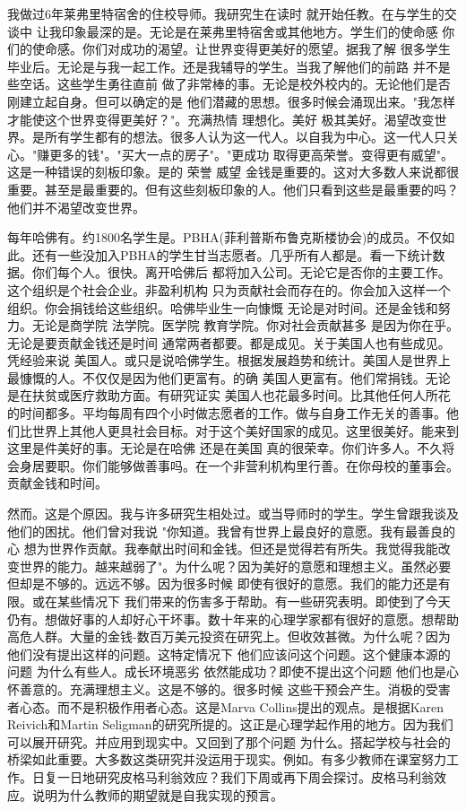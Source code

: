 我做过6年莱弗里特宿舍的住校导师。我研究生在读时 就开始任教。在与学生的交谈中 让我印象最深的是。无论是在莱弗里特宿舍或其他地方。学生们的使命感 你们的使命感。你们对成功的渴望。让世界变得更美好的愿望。据我了解 很多学生毕业后。无论是与我一起工作。还是我辅导的学生。当我了解他们的前路 并不是些空话。这些学生勇往直前 做了非常棒的事。无论是校外校内的。无论他们是否刚建立起自身。但可以确定的是 他们潜藏的思想。很多时候会涌现出来。"我怎样才能使这个世界变得更美好？"。充满热情 理想化。美好 极其美好。渴望改变世界。是所有学生都有的想法。很多人认为这一代人。以自我为中心。这一代人只关心。"赚更多的钱"。"买大一点的房子"。"更成功 取得更高荣誉。变得更有威望"。这是一种错误的刻板印象。是的 荣誉 威望 金钱是重要的。这对大多数人来说都很重要。甚至是最重要的。但有这些刻板印象的人。他们只看到这些是最重要的吗？他们并不渴望改变世界。 

每年哈佛有。约1800名学生是。PBHA(菲利普斯布鲁克斯楼协会)的成员。不仅如此。还有一些没加入PBHA的学生甘当志愿者。几乎所有人都是。看一下统计数据。你们每个人。很快。离开哈佛后 都将加入公司。无论它是否你的主要工作。这个组织是个社会企业。非盈利机构 只为贡献社会而存在的。你会加入这样一个组织。你会捐钱给这些组织。哈佛毕业生一向慷慨 无论是对时间。还是金钱和努力。无论是商学院 法学院。医学院 教育学院。你对社会贡献甚多 是因为你在乎。无论是要贡献金钱还是时间 通常两者都要。都是成见。关于美国人也有些成见。凭经验来说 美国人。或只是说哈佛学生。根据发展趋势和统计。美国人是世界上最慷慨的人。不仅仅是因为他们更富有。的确 美国人更富有。他们常捐钱。无论是在扶贫或医疗救助方面。有研究证实 美国人也花最多时间。比其他任何人所花的时间都多。平均每周有四个小时做志愿者的工作。做与自身工作无关的善事。他们比世界上其他人更具社会目标。对于这个美好国家的成见。这里很美好。能来到这里是件美好的事。无论是在哈佛 还是在美国 真的很荣幸。你们许多人。不久将会身居要职。你们能够做善事吗。在一个非营利机构里行善。在你母校的董事会。贡献金钱和时间。 

然而。这是个原因。我与许多研究生相处过。或当导师时的学生。学生曾跟我谈及他们的困扰。他们曾对我说 "你知道。我曾有世界上最良好的意愿。我有最善良的心 想为世界作贡献。我奉献出时间和金钱。但还是觉得若有所失。我觉得我能改变世界的能力。越来越弱了"。为什么呢？因为美好的意愿和理想主义。虽然必要 但却是不够的。远远不够。因为很多时候 即使有很好的意愿。我们的能力还是有限。或在某些情况下 我们带来的伤害多于帮助。有一些研究表明。即使到了今天仍有。想做好事的人却好心干坏事。数十年来的心理学家都有很好的意愿。想帮助高危人群。大量的金钱-数百万美元投资在研究上。但收效甚微。为什么呢？因为他们没有提出这样的问题。这特定情况下 他们应该问这个问题。这个健康本源的问题 为什么有些人。成长环境恶劣 依然能成功？即使不提出这个问题 他们也是心怀善意的。充满理想主义。这是不够的。很多时候 这些干预会产生。消极的受害者心态。而不是积极作用者心态。这是Marva Collins提出的观点。是根据Karen Reivich和Martin Seligman的研究所提的。这正是心理学起作用的地方。因为我们可以展开研究。并应用到现实中。又回到了那个问题 为什么。搭起学校与社会的桥梁如此重要。大多数这类研究并没运用于现实。例如。有多少教师在课室努力工作。日复一日地研究皮格马利翁效应？我们下周或再下周会探讨。皮格马利翁效应。说明为什么教师的期望就是自我实现的预言。 

